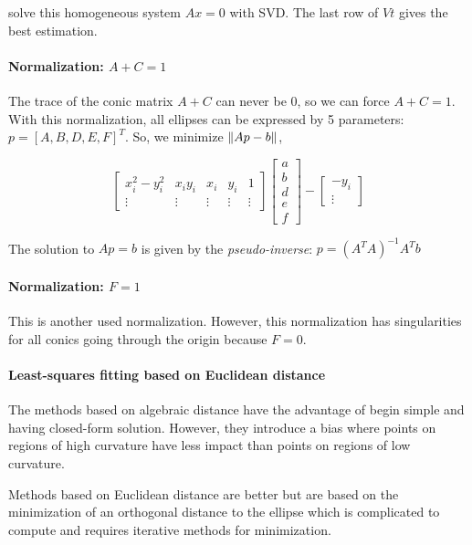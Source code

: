 solve this homogeneous system $Ax=0$ with SVD. The last row of $Vt$ gives the best estimation.

\paragraph{Normalization: $A + C = 1$}
The trace of the conic matrix $A + C$ can never be 0, so we can force $A + C = 1$.
With this normalization, all ellipses can be expressed by 5 parameters: $p = [A, B, D, E, F]^T$. So, we minimize $\left\lVert Ap-b\right\rVert$,

\begin{equation}
    \left[
    \begin{array}{ccccc}
    x_i^2 - y_i^2 & x_i y_i & x_i & y_i & 1  \\
    \vdots &\vdots &\vdots &\vdots &\vdots 
    \end{array}
    \right]
    \left[\begin{array}{c}
        a \\ b \\ d \\ e \\ f
    \end{array} \right]
     - 
    \left[\begin{array}{c}
        -y_i \\
        \vdots
    \end{array} \right]
\end{equation}


The solution to $Ap=b$ is given by the \textit{pseudo-inverse}: $p = (A^T A)^{-1} A^T b$


\paragraph{Normalization: $F = 1$}
This is another used normalization. However, this normalization has singularities for all conics going through the origin because $F = 0$.


\paragraph{Least-squares fitting based on Euclidean distance}

The methods based on algebraic distance have the advantage of begin simple and having closed-form solution. However, they introduce a bias where points on regions of high curvature have less impact than points on regions of low curvature.

Methods based on Euclidean distance are better but are based on the minimization of an orthogonal distance to the ellipse which is complicated to compute and requires iterative methods for minimization.



